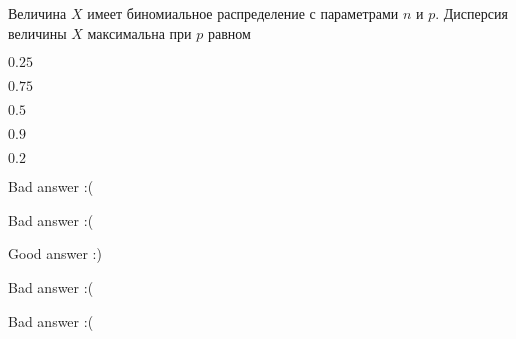 
\begin{question}
Величина \(X\) имеет биномиальное распределение с параметрами \(n\) и
\(p\). Дисперсия величины \(X\) максимальна при \(p\) равном
\begin{answerlist}
  \item \(0.25\)
  \item \(0.75\)
  \item \(0.5\)
  \item \(0.9\)
  \item \(0.2\)
\end{answerlist}
\end{question}

\begin{solution}
\begin{answerlist}
  \item Bad answer :(
  \item Bad answer :(
  \item Good answer :)
  \item Bad answer :(
  \item Bad answer :(
\end{answerlist}
\end{solution}

